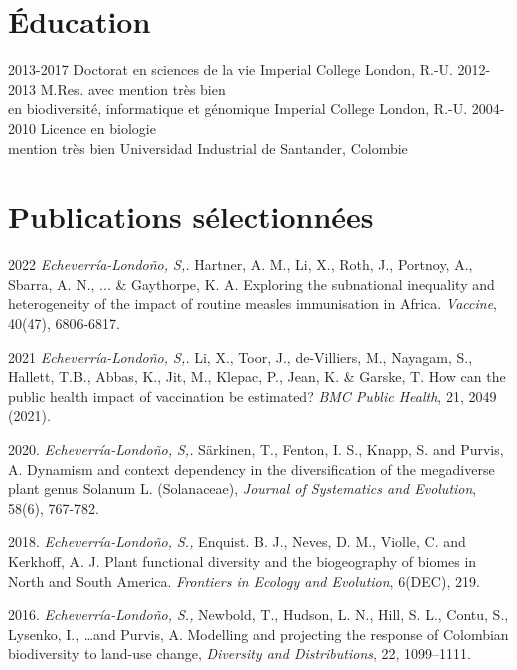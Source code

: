 \documentclass[icon]{twentysecondcv}
\begin{document}
\section{Éducation}

\begin{twenty}
  \twentyitem
    {2013-2017}
    {Doctorat  {\normalfont en sciences de la vie}}
    {Imperial College London, R.-U.}
    {}
  \twentyitem
    {2012-2013}
    {M.Res. avec mention très bien \\  {\normalfont en biodiversité, informatique et génomique}}
    {Imperial College London, R.-U.}
    {}
  \twentyitem
    {2004-2010}
    {Licence en biologie  \\  mention très bien}
    {Universidad Industrial de Santander, Colombie}
    {}
 \end{twenty}
 
 
\section{Publications sélectionnées}

\small 2022 \textit{Echeverr\'ia-Londo\~no, S,.}  Hartner, A. M., Li, X., Roth, J., Portnoy, A., Sbarra, A. N., ... \& Gaythorpe, K. A. Exploring the subnational inequality and heterogeneity of the impact of routine measles immunisation in Africa. \textit{Vaccine}, 40(47), 6806-6817. 

\small  2021 \textit{Echeverr\'ia-Londo\~no, S,.}  Li, X., Toor, J., de-Villiers, M., Nayagam, S., Hallett, T.B., Abbas, K., Jit, M., Klepac, P., Jean, K. \&  Garske, T. How can the public health impact of vaccination be estimated? \textit{BMC Public Health}, 21, 2049 (2021).

\small  2020. \textit{Echeverr\'ia-Londo\~no, S,.}  S{\"a}rkinen, T., Fenton, I. S., Knapp, S. and Purvis, A. Dynamism and context dependency in the diversification of the megadiverse plant genus Solanum L. (Solanaceae), \textit{Journal of Systematics and Evolution},  58(6), 767-782. 

\small  2018. \textit{Echeverr\'ia-Londo\~no, S.,} Enquist. B. J., Neves, D. M., Violle, C. and Kerkhoff, A. J. Plant functional diversity and the biogeography of biomes in North and South America. \textit{Frontiers in Ecology and Evolution}, 6(DEC), 219.

\small  2016. \textit{Echeverr\'ia-Londo\~no, S.,} Newbold, T., Hudson, L. N., Hill, S. L., Contu, S., Lysenko, I., \dots and Purvis, A. Modelling and projecting the response of Colombian biodiversity to land-use change, \textit{Diversity and Distributions}, 22, 1099--1111. 
\end{document}
